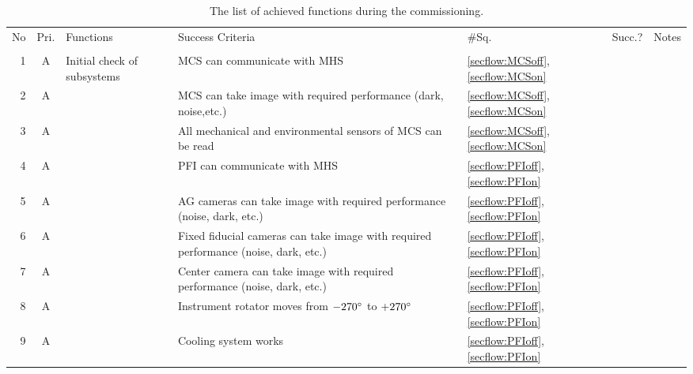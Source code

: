 

\begin{landscape}
\begin{longtable}{r|c|p{50mm}|p{100mm}|p{11mm}|c|p{35mm}}
\caption{
The list of achieved functions during the commissioning.}
\label{tbl:funcs} 
\footnotesize
\\ \hline
No	& Pri.	& Functions & Success Criteria & \#Sq.  & Succ.?  & Notes \\ \hline \hline
\endhead
\endfoot
\multicolumn{7}{l}{\hspace{5mm} {\bf Fiber Allocation}} \\ \hline
1	& A 	& Initial check of subsystems	& MCS can communicate with MHS	& \ref{secflow:MCSoff}, \ref{secflow:MCSon}	&	& 	\\ \cline{1-2}\cline{4-7}
2	& A 	&	& MCS can take image with required performance (dark, noise,etc.)	& \ref{secflow:MCSoff}, \ref{secflow:MCSon}	&	& 	\\ \cline{1-2}\cline{4-7}
3	& A 	& 	& All mechanical and environmental sensors of MCS can be read	& \ref{secflow:MCSoff}, \ref{secflow:MCSon}	&	&	\\ \cline{1-2}\cline{4-7}
4	& A	&	& PFI can communicate with MHS	& \ref{secflow:PFIoff}, \ref{secflow:PFIon}	&	& \\ \cline{1-2}\cline{4-7}
5	& A	&	& AG cameras can take image with required performance (noise, dark, etc.)	& \ref{secflow:PFIoff}, \ref{secflow:PFIon}	&	& \\ \cline{1-2}\cline{4-7}
6	& A	&	& Fixed fiducial cameras can take image with required performance (noise, dark, etc.)	& \ref{secflow:PFIoff}, \ref{secflow:PFIon}	&	& \\ \cline{1-2}\cline{4-7}
7	& A	&	& Center camera can take image with required performance (noise, dark, etc.)	& \ref{secflow:PFIoff}, \ref{secflow:PFIon}	&	& \\ \cline{1-2}\cline{4-7}
8	& A	&	& Instrument rotator moves from $-270 ^\circ$ to $+270 ^\circ$	& \ref{secflow:PFIoff}, \ref{secflow:PFIon}	&	& \\ \cline{1-2}\cline{4-7}
9	& A	&	& Cooling system works	& \ref{secflow:PFIoff}, \ref{secflow:PFIon}	&	& \\ \cline{1-2}\cline{4-7}

\end{longtable}
\end{landscape}
